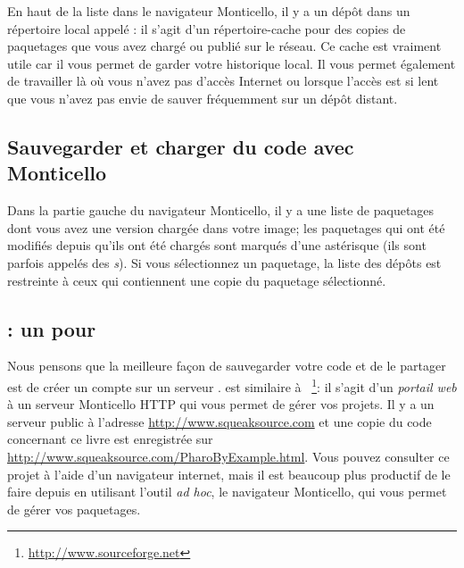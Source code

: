 \documentclass[a4paper,10pt,twoside]{book}
\begin{document}
En haut de la liste dans le navigateur Monticello, il y a un dépôt
dans un répertoire local appelé : il s'agit
d'un répertoire-cache pour des copies de paquetages que vous avez
chargé ou publié sur le réseau. Ce cache est vraiment utile car il
vous permet de garder votre historique local. Il vous permet également
de travailler là o\`u vous n'avez pas d'accès Internet ou lorsque 
l'accès est si lent que vous n'avez pas envie de sauver fréquemment 
sur un dépôt distant.

\subsection{Sauvegarder et charger du code avec Monticello}
Dans la partie gauche du navigateur Monticello, il y a une liste de
paquetages dont vous avez une version chargée dans votre image; les
paquetages qui ont été modifiés depuis qu'ils ont été chargés sont
marqués d'une 
astérisque
(ils sont parfois appelés des \emph{s}). Si vous sélectionnez un paquetage, la liste des dépôts est restreinte à ceux qui contiennent une copie du paquetage sélectionné.



\subsection{\ind{\sqsrc}: un  pour \pharo} 
Nous pensons que la meilleure façon de sauvegarder votre code et de le
partager est de créer un compte sur un serveur
\sqsrc. \sqsrc est similaire à
\sourceforge~\footnote{\url{http://www.sourceforge.net}}: il s'agit d'un
\emph{portail web} à un serveur Monticello HTTP qui vous permet de gérer vos projets.
Il y a un serveur public \sqsrc à l'adresse
\url{http://www.squeaksource.com} et une copie du code concernant ce
livre est enregistrée sur
\url{http://www.squeaksource.com/PharoByExample.html}. Vous pouvez
consulter ce projet à l'aide d'un navigateur internet, mais il est
beaucoup plus productif de le faire depuis \pharo en utilisant
l'outil \emph{ad hoc}, le navigateur Monticello, qui vous permet de
gérer vos paquetages.
\end{document}
